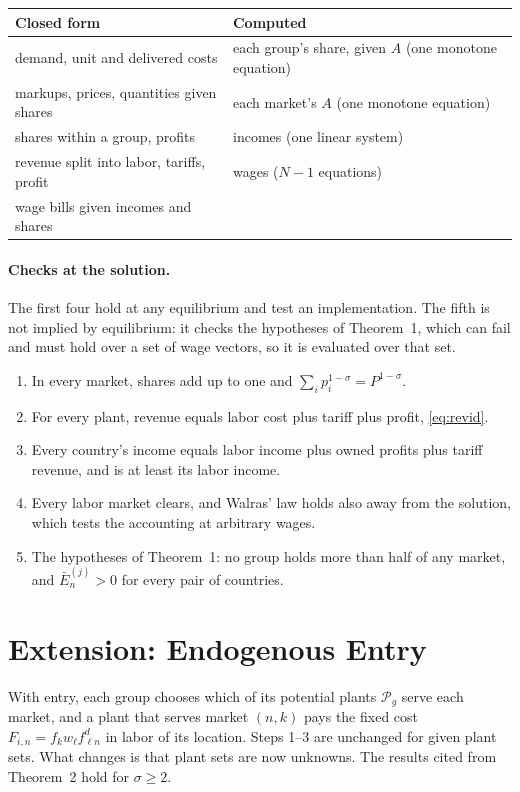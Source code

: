 \documentclass[11pt]{article}
\newcommand{\cP}{\mathcal P}
\begin{document}
\begin{center}
\small
\begin{tabular}{@{}ll@{}}
\toprule
Closed form & Computed \\
\midrule
demand, unit and delivered costs & each group's share, given $A$ (one monotone equation) \\
markups, prices, quantities given shares & each market's $A$ (one monotone equation) \\
shares within a group, profits & incomes (one linear system) \\
revenue split into labor, tariffs, profit & wages ($N-1$ equations) \\
wage bills given incomes and shares & \\
\bottomrule
\end{tabular}
\end{center}

\paragraph{Checks at the solution.} The first four hold at any equilibrium and test an
implementation. The fifth is not implied by equilibrium: it checks the hypotheses of
Theorem~1, which can fail and must hold over a set of wage vectors, so it is evaluated
over that set.
\begin{enumerate}
\item In every market, shares add up to one and $\sum_ip_i^{1-\sigma}=P^{1-\sigma}$.
\item For every plant, revenue equals labor cost plus tariff plus profit,
\eqref{eq:revid}.
\item Every country's income equals labor income plus owned profits plus tariff
revenue, and is at least its labor income.
\item Every labor market clears, and Walras' law holds also away from the solution,
which tests the accounting at arbitrary wages.
\item The hypotheses of Theorem~1: no group holds more than half of any market, and
$\bar E^{(j)}_n>0$ for every pair of countries.
\end{enumerate}

\section{Extension: Endogenous Entry}
\label{sec:entry}

With entry, each group chooses which of its potential plants $\cP_g$ serve each market,
and a plant that serves market $(n,k)$ pays the fixed cost $F_{i,n}=f_kw_\ell
f^d_{\ell n}$ in labor of its location. Steps 1--3 are unchanged for given plant sets.
What changes is that plant sets are now unknowns. The results cited from Theorem~2 hold
for $\sigma\ge2$.
\end{document}

